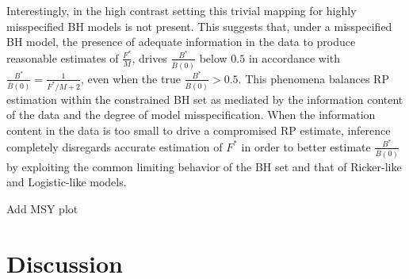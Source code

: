 %
Interestingly, in the high contrast setting this trivial mapping for highly
misspecified BH models is not present. This suggests that, under a
misspecified BH model, the presence of adequate information in the data to
produce reasonable estimates of $\frac{F^*}{M}$, drives $\frac{B^*}{\bar B(0)}$
below $0.5$ in accordance with $\frac{B^*}{\bar B(0)}=\frac{1}{F^*/M+2}$,
even when the true $\frac{B^*}{\bar B(0)}>0.5$.
This phenomena balances RP estimation within the constrained BH set as
mediated by the information content of the data and the degree of model
misspecification. When the information content in the data is too small to
drive a compromised RP estimate, inference completely disregards accurate
estimation of $F^*$ in order to better estimate $\frac{B^*}{\bar B(0)}$
by exploiting the common limiting behavior of the BH set and that of
Ricker-like and Logistic-like models.

%
{\color{red}Add MSY plot}


%
\clearpage
\section{Discussion}


